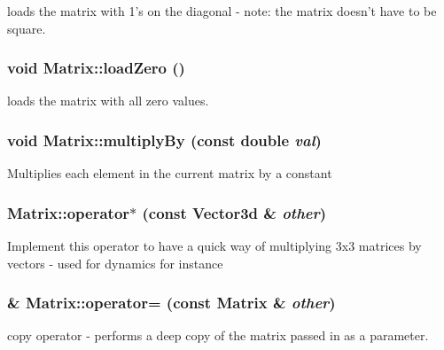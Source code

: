 loads the matrix with 1's on the diagonal -\/ note: the matrix doesn't have to be square. \hypertarget{classCartWheel_1_1Math_1_1Matrix_a197165ec6577b17ee5ca89af07007d64}{
\subsubsection[{loadZero}]{\setlength{\rightskip}{0pt plus 5cm}void Matrix::loadZero ()}}
\label{classCartWheel_1_1Math_1_1Matrix_a197165ec6577b17ee5ca89af07007d64}
loads the matrix with all zero values. \hypertarget{classCartWheel_1_1Math_1_1Matrix_a804032859efce36d43e569ed767271b0}{
\subsubsection[{multiplyBy}]{\setlength{\rightskip}{0pt plus 5cm}void Matrix::multiplyBy (const double {\em val})}}
\label{classCartWheel_1_1Math_1_1Matrix_a804032859efce36d43e569ed767271b0}
Multiplies each element in the current matrix by a constant \hypertarget{classCartWheel_1_1Math_1_1Matrix_ad33238e122583ca44b13197d6f845d91}{
\subsubsection[{operator$\ast$}]{ Matrix::operator$\ast$ (const {\bf Vector3d} \& {\em other})}}
\label{classCartWheel_1_1Math_1_1Matrix_ad33238e122583ca44b13197d6f845d91}
Implement this operator to have a quick way of multiplying 3x3 matrices by vectors -\/ used for dynamics for instance \hypertarget{classCartWheel_1_1Math_1_1Matrix_a3e40db12ae78b7616ee3f099bb15f13d}{
\subsubsection[{operator=}]{ \& Matrix::operator= (const {\bf Matrix} \& {\em other})}}
\label{classCartWheel_1_1Math_1_1Matrix_a3e40db12ae78b7616ee3f099bb15f13d}
copy operator -\/ performs a deep copy of the matrix passed in as a parameter. 


